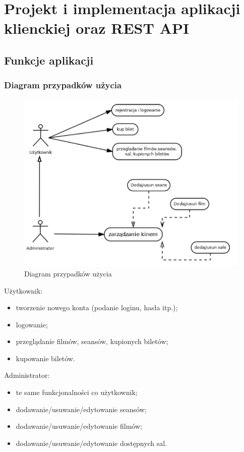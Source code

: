 \chapter{Projekt i implementacja aplikacji klienckiej oraz REST API}

\section{Funkcje aplikacji}


\subsection{Diagram przypadków użycia}

\begin{figure} [H]
	\centering
	\includegraphics[width=0.6\linewidth]{rozdzial05/diagram.png}
	\caption{Diagram przypadków użycia}
	\label{fig:schem}
\end{figure}

Użytkownik:
\begin{itemize}
	\item tworzenie nowego konta (podanie loginu, hasła itp.);
	\item logowanie;
	\item przeglądanie filmów, seansów, kupionych biletów;
	\item kupowanie biletów.
\end{itemize}

Administrator:
\begin{itemize}
	\item te same funkcjonalności co użytkownik;
	\item dodawanie/usuwanie/edytowanie seansów;
	\item dodawanie/usuwanie/edytowanie filmów;
	\item dodawanie/usuwanie/edytowanie dostępnych sal.
\end{itemize}

